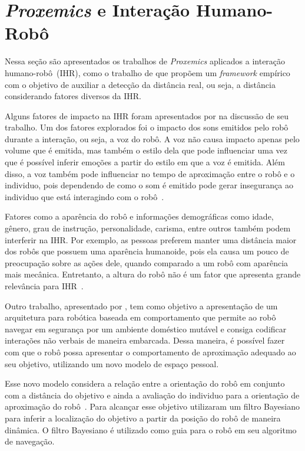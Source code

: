 \section{\emph{Proxemics} e Interação Humano-Robô}
\label{sec:proxemicsihr}
Nessa seção são apresentados os trabalhos de \emph{Proxemics} aplicados a interação humano-robô~(IHR), como o trabalho de  que propõem um \emph{framework} empírico com o objetivo de auxiliar a detecção da distância real, ou seja, a distância considerando fatores diversos da IHR.

Alguns fatores de impacto na IHR foram apresentados por  na discussão de seu trabalho. Um dos fatores explorados foi o impacto dos sons emitidos pelo robô durante a interação, ou seja, a voz do robô. A voz não causa impacto apenas pelo volume que é emitida, mas também o estilo dela que pode influenciar uma vez que é possível inferir emoções a partir do estilo em que a voz é emitida. Além disso, a voz também pode influenciar no tempo de aproximação entre o robô e o individuo, pois dependendo de como o som é emitido pode gerar insegurança ao individuo que está interagindo com o robô~\cite{Walters:2009}.

Fatores como a aparência do robô e informações demográficas como idade, gênero, grau de instrução, personalidade, carisma, entre outros também podem interferir na IHR. Por exemplo, as pessoas preferem manter uma distância maior dos robôs que possuem uma aparência humanoide, pois ela causa um pouco de preocupação sobre as ações dele, quando comparado a um robô com aparência mais mecânica. Entretanto, a altura do robô não é um fator que apresenta grande relevância para IHR~\cite{Walters:2009}.

Outro trabalho, apresentado por , tem como objetivo a apresentação de um arquitetura para robótica baseada em comportamento que permite ao robô navegar em segurança por um ambiente doméstico mutável e consiga codificar interações não verbais de maneira embarcada. Dessa maneira, é possível fazer com que o robô possa apresentar o comportamento de aproximação adequado ao seu objetivo, utilizando um novo modelo de espaço pessoal.

Esse novo modelo considera a relação entre a orientação do robô em conjunto com a distância do objetivo e ainda a avaliação do individuo para a orientação de aproximação do robô~\cite{Torta:2011}. Para alcançar esse objetivo  utilizaram um filtro Bayesiano para inferir a localização do objetivo a partir da posição do robô de maneira dinâmica. O filtro Bayesiano é utilizado como guia para o robô em seu algoritmo de navegação.

